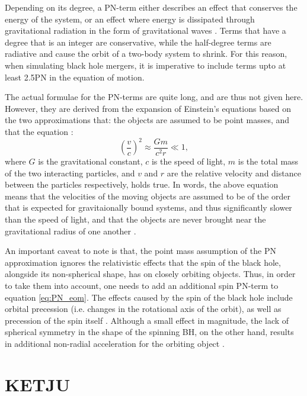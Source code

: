 \documentclass[english, twoside]{HYgradu}
\begin{document}
Depending on its degree, a PN-term either describes an effect that conserves the energy of the system, or an effect where energy is dissipated through gravitational radiation in the form of gravitational waves \citep{Mora2004}. Terms that have a degree that is an integer are conservative, while the half-degree terms are radiative and cause the orbit of a two-body system to shrink. For this reason, when simulating black hole mergers, it is imperative to include terms upto at least 2.5PN in the equation of motion.

The actual formulae for the PN-terms are quite long, and are thus not given here. However, they are derived from the expansion of Einstein's equations based on the two approximations that: the objects are assumed to be point masses, and that the equation \citep{MerrittBook}:
\begin{equation}
\left( \frac{v}{c} \right)^2 \approx \frac{Gm}{c^2r} \ll 1,
\end{equation}
where $G$ is the gravitational constant, $c$ is the speed of light, $m$ is the total mass of the two interacting particles, and $v$ and $r$ are the relative velocity and distance between the particles respectively, holds true. In words, the above equation means that the velocities of the moving objects are assumed to be of the order that is expected for gravitaionally bound systems, and thus significantly slower than the speed of light, and that the objects are never brought near the gravitational radius of one another \citep{MerrittBook}. 

An important caveat to note is that, the point mass assumption of the PN approximation ignores the relativistic effects that the spin of the black hole, alongside its non-spherical shape, has on closely orbiting objects. Thus, in order to take them into account, one needs to add an additional spin PN-term to equation \ref{eq:PN_eom}. The effects caused by the spin of the black hole include orbital precession (i.e. changes in the rotational axis of the orbit), as well as precession of the spin itself \citep{Kidder1995}. Although a small effect in magnitude, the lack of spherical symmetry in the shape of the spinning BH, on the other hand, results in additional non-radial acceleration for the orbiting object \citep{MerrittBook}. 

\chapter{KETJU} \label{chapter:3}
\end{document}
